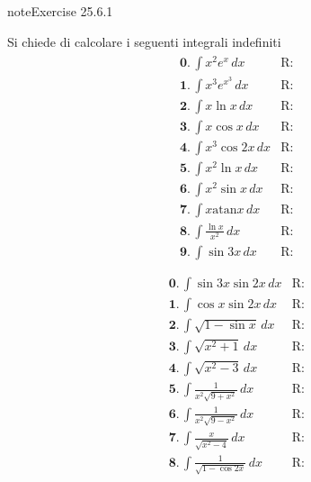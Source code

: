 \documentclass[letterpaper,10pt,italian]{jupyterBook}
\begin{document}
\begin{sphinxadmonition}{note}{Exercise 25.6.1}



\sphinxAtStartPar
Si chiede di calcolare i seguenti integrali indefiniti
\begin{equation*}
\begin{split}\begin{aligned}
 & \mathbf{0.} \,  \int x^2 e^x \, dx & \text{R: } \\
 & \mathbf{1.} \,  \int x^3 e^{x^3} \, dx & \text{R: } \\
 & \mathbf{2.} \,  \int x \ln x \, dx & \text{R: } \\
 & \mathbf{3.} \,  \int x \cos x \, dx & \text{R: } \\
 & \mathbf{4.} \,  \int x^3 \cos 2x \, dx & \text{R: } \\
 & \mathbf{5.} \,  \int x^2 \ln x \, dx & \text{R: } \\
 & \mathbf{6.} \,  \int x^2 \sin x \, dx & \text{R: } \\
 & \mathbf{7.} \,  \int x \text{atan} x \, dx & \text{R: } \\
 & \mathbf{8.} \,  \int \frac{\ln x}{x^2} \, dx & \text{R: } \\
 & \mathbf{9.} \,  \int \sin 3x \, dx & \text{R: } \\
\end{aligned}\end{split}
\end{equation*}\begin{equation*}
\begin{split}\begin{aligned}
 & \mathbf{0.} \,  \int \sin 3x \sin 2x \, dx & \text{R: } \\
 & \mathbf{1.} \,  \int \cos x \sin 2x \, dx & \text{R: } \\
 & \mathbf{2.} \,  \int \sqrt{1 - \sin x} \, dx & \text{R: } \\
 & \mathbf{3.} \,  \int \sqrt{x^2 + 1} \, dx & \text{R: } \\
 & \mathbf{4.} \,  \int \sqrt{x^2 - 3} \, dx & \text{R: } \\
 & \mathbf{5.} \,  \int \frac{1}{x^2 \sqrt{9+x^2}} \, dx & \text{R: } \\
 & \mathbf{6.} \,  \int \frac{1}{x^2 \sqrt{9-x^2}} \, dx & \text{R: } \\
 & \mathbf{7.} \,  \int \frac{x}{\sqrt{x^2-4}} \, dx & \text{R: } \\
 & \mathbf{8.} \,  \int \frac{1}{\sqrt{1 - \cos 2 x}} \, dx & \text{R: } \\

\end{aligned}
\end{split}
\end{equation*}
\end{sphinxadmonition}
\end{document}

